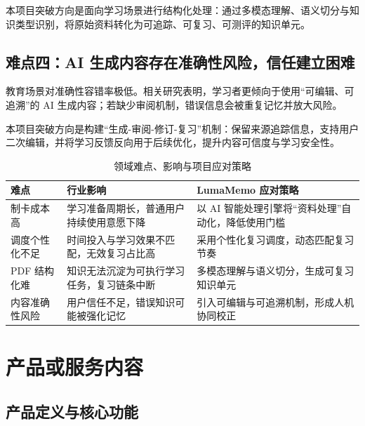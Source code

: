 本项目突破方向是面向学习场景进行结构化处理：通过多模态理解、语义切分与知识类型识别，将原始资料转化为可追踪、可复习、可测评的知识单元。

\subsection{难点四：AI 生成内容存在准确性风险，信任建立困难}

教育场景对准确性容错率极低。相关研究表明，学习者更倾向于使用“可编辑、可追溯”的 AI 生成内容；若缺少审阅机制，错误信息会被重复记忆并放大风险。

本项目突破方向是构建“生成-审阅-修订-复习”机制：保留来源追踪信息，支持用户二次编辑，并将学习反馈反向用于后续优化，提升内容可信度与学习安全性。

\begin{table}[htbp]
	\centering
	\caption{领域难点、影响与项目应对策略}
	\label{tab:chap3_pain_solution}
	\begin{tabular}{p{3.3cm}p{4.2cm}p{5.8cm}}
		\toprule
		\textbf{难点} & \textbf{行业影响} & \textbf{LumaMemo 应对策略} \\
		\midrule
		制卡成本高 & 学习准备周期长，普通用户持续使用意愿下降 & 以 AI 智能处理引擎将“资料处理”自动化，降低使用门槛 \\
		调度个性化不足 & 时间投入与学习效果不匹配，无效复习占比高 & 采用个性化复习调度，动态匹配复习节奏 \\
		PDF 结构化难 & 知识无法沉淀为可执行学习任务，复习链条中断 & 多模态理解与语义切分，生成可复习知识单元 \\
		内容准确性风险 & 用户信任不足，错误知识可能被强化记忆 & 引入可编辑与可追溯机制，形成人机协同校正 \\
		\bottomrule
	\end{tabular}
\end{table}

\section{产品或服务内容}

\subsection{产品定义与核心功能}

